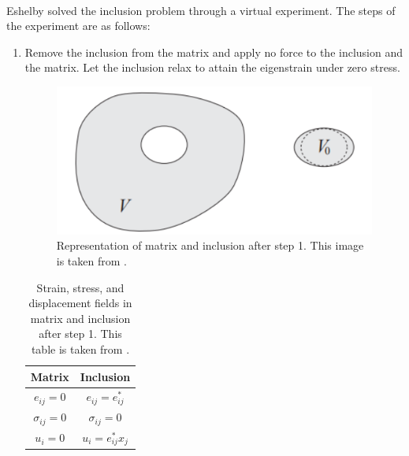 \documentclass[12pt, a4paper]{report}
\begin{document}
\paragraph{}
Eshelby solved the inclusion problem through a virtual experiment. The steps of the experiment are as follows:
\begin{enumerate}

    \item Remove the inclusion from the matrix and apply no force to the inclusion and the matrix. Let the inclusion relax to attain the eigenstrain under zero stress.
        \begin{figure}[H]
            \centering
            \includegraphics [height=2 in]{eigstress2}
            \caption{Representation of matrix and inclusion after step 1. This image is taken from \cite{stanford_notes}.}
            \label{fig:eigstress2}
        \end{figure}
        \begin{table}[H]
            \centering
            \begin{tabular}{|c|c|}
                \hline
                \textbf{Matrix} & \textbf{Inclusion} \\
                \hline
                $e_{ij} = 0$ & $e_{ij} = e^{*}_{ij}$ \\
                $\sigma_{ij} = 0$ & $\sigma_{ij} = 0$ \\
                $u_{i} = 0$ & $u_{i} = e^{*}_{ij}x_{j}$ \\
                \hline
            \end{tabular}
            \caption{Strain, stress, and displacement fields in matrix and inclusion after step 1. This table is taken from \cite{stanford_notes}.}
            \label{tab:step1}
        \end{table}


\end{enumerate}
\end{document}
